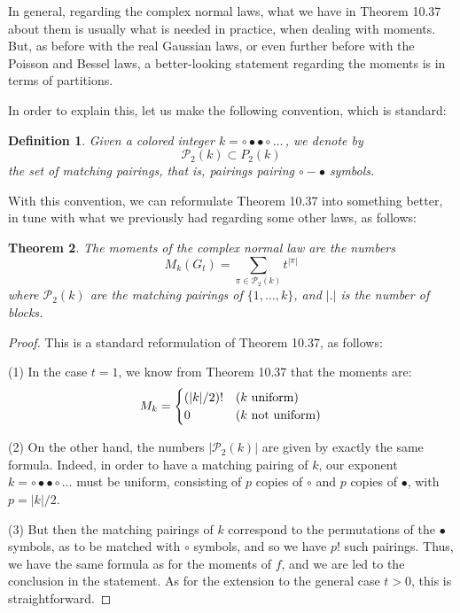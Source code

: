 \documentclass[12pt]{amsbook}
\newtheorem{theorem}{Theorem}[chapter]
\newtheorem{definition}[theorem]{Definition}
\begin{document}
In general, regarding the complex normal laws, what we have in Theorem 10.37 about them is usually what is needed in practice, when dealing with moments. But, as before with the real Gaussian laws, or even further before with the Poisson and Bessel laws, a better-looking statement regarding the moments is in terms of partitions. 

\bigskip

In order to explain this, let us make the following convention, which is standard:

\begin{definition}
Given a colored integer $k=\circ\bullet\bullet\circ\ldots\,$, we denote by
$$\mathcal P_2(k)\subset P_2(k)$$
the set of matching pairings, that is, pairings pairing $\circ-\bullet$ symbols. 
\end{definition}

With this convention, we can reformulate Theorem 10.37 into something better, in tune with what we previously had regarding some other laws, as follows:


\begin{theorem}
The moments of the complex normal law are the numbers
$$M_k(G_t)=\sum_{\pi\in\mathcal P_2(k)}t^{|\pi|}$$
where $\mathcal P_2(k)$ are the matching pairings of $\{1,\ldots,k\}$, and $|.|$ is the number of blocks.
\end{theorem}

\begin{proof}
This is a standard reformulation of Theorem 10.37, as follows:

\medskip

(1) In the case $t=1$, we know from Theorem 10.37 that the moments are:
$$M_k=\begin{cases}
(|k|/2)!&(k\ {\rm uniform})\\
0&(k\ {\rm not\ uniform})
\end{cases}$$

(2) On the other hand, the numbers $|\mathcal P_2(k)|$ are given by exactly the same formula. Indeed, in order to have a matching pairing of $k$, our exponent $k=\circ\bullet\bullet\circ\ldots$ must be uniform, consisting of $p$ copies of $\circ$ and $p$ copies of $\bullet$, with $p=|k|/2$. 

\medskip

(3) But then the matching pairings of $k$ correspond to the permutations of the $\bullet$ symbols, as to be matched with $\circ$ symbols, and so we have $p!$ such pairings. Thus, we have the same formula as for the moments of $f$, and we are led to the conclusion in the statement. As for the extension to the general case $t>0$, this is straightforward.
\end{proof}
\end{document}
